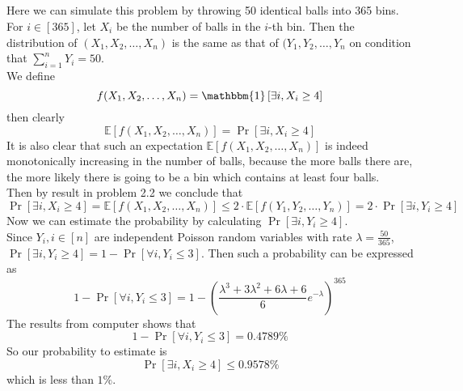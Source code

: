 \documentclass[12pt,letterpaper]{article}
\begin{document}
\subsection{}
Here we can simulate this problem by throwing 50 identical balls into 365 bins.\\
For $i\in [365]$, let $X_i$ be the number of balls in the $i$-th bin.
Then the distribution of $(X_1,X_2,\dots,X_n)$ is the same as that of 
$(Y_1,Y_2,\dots,Y_n$ on condition that $\sum_{i=1}^{n}Y_i=50$.\\
We define $$f(X_1,X_2,\dots,X_n)=\mathbbm{1}\left[\exists i, X_i\geq 4\right]$$
then clearly 
$$\mathbb{E}\left[f(X_1,X_2,\dots,X_n)\right]
=\Pr\left[\exists i,X_i\geq 4\right]$$
It is also clear that such an expectation $\mathbb{E}\left[f(X_1,X_2,\dots,X_n)\right]$
is indeed monotonically increasing in the number of balls,
because the more balls there are,
the more likely there is going to be a bin which contains at least four balls.\\
Then by result in problem 2.2 we conclude that
$$\Pr\left[\exists i,X_i\geq 4\right]=
\mathbb{E}\left[f(X_1,X_2,\dots,X_n)\right]\leq
2\cdot\mathbb{E}\left[f(Y_1,Y_2,\dots,Y_n)\right]=
2\cdot\Pr\left[\exists i,Y_i\geq 4\right]$$
Now we can estimate the probability by calculating 
$\Pr\left[\exists i,Y_i\geq 4\right]$.\\
Since $Y_i, i\in[n]$ are independent Poisson random variables with rate $\lambda=\frac{50}{365}$,
$\Pr\left[\exists i,Y_i\geq 4\right]=1-\Pr\left[\forall i,Y_i\leq 3\right]$.
Then such a probability can be expressed as 
$$1-\Pr\left[\forall i, Y_i \leq 3\right]=1-\left(\frac{\lambda^3+3\lambda^2+6\lambda+6}{6}e^{-\lambda}\right)^{365}$$
The results from computer shows that 
$$1-\Pr\left[\forall i, Y_i \leq 3\right]=0.4789\%$$
So our probability to estimate is 
$$\Pr\left[\exists i,X_i\geq 4\right]\leq 0.9578\%$$
which is less than $1\%$.
\end{document}
